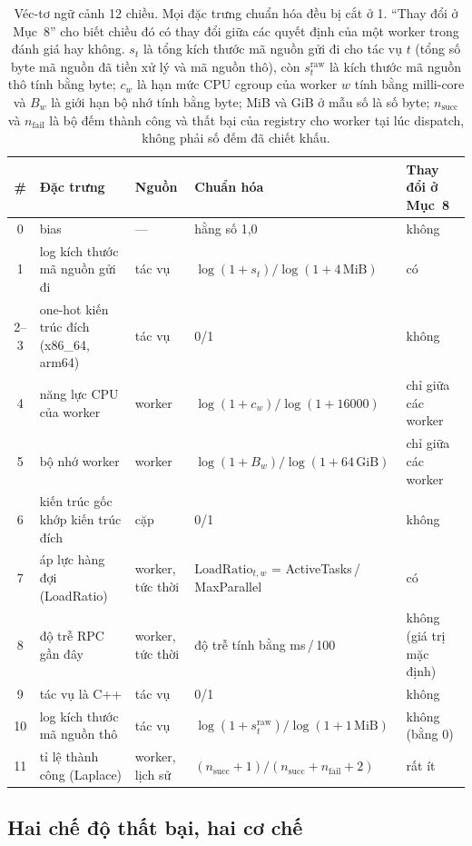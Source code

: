 \documentclass[final,5p,times,twocolumn]{elsarticle}
\begin{document}
\begin{table}[t]
\centering
\caption{Véc-tơ ngữ cảnh 12 chiều. Mọi đặc trưng chuẩn hóa đều bị cắt ở 1. ``Thay đổi ở Mục~8'' cho biết chiều đó có thay đổi giữa các quyết định của một worker trong đánh giá hay không. $s_t$ là tổng kích thước mã nguồn gửi đi cho tác vụ $t$ (tổng số byte mã nguồn đã tiền xử lý và mã nguồn thô), còn $s^{\text{raw}}_t$ là kích thước mã nguồn thô tính bằng byte; $c_w$ là hạn mức CPU cgroup của worker $w$ tính bằng milli-core và $B_w$ là giới hạn bộ nhớ tính bằng byte; MiB và GiB ở mẫu số là số byte; $n_{\text{succ}}$ và $n_{\text{fail}}$ là bộ đếm thành công và thất bại của registry cho worker tại lúc dispatch, không phải số đếm đã chiết khấu.}
\label{tab:features}
\footnotesize
\begin{tabular}{cllll}
\toprule
\# & Đặc trưng & Nguồn & Chuẩn hóa & Thay đổi ở Mục~8 \\
\midrule
0 & bias & --- & hằng số 1,0 & không \\
1 & log kích thước mã nguồn gửi đi & tác vụ & $\log(1+s_t)/\log(1+4\,\text{MiB})$ & có \\
2--3 & one-hot kiến trúc đích (x86\_64, arm64) & tác vụ & 0/1 & không \\
4 & năng lực CPU của worker & worker & $\log(1+c_w)/\log(1+16000)$ & chỉ giữa các worker \\
5 & bộ nhớ worker & worker & $\log(1+B_w)/\log(1+64\,\text{GiB})$ & chỉ giữa các worker \\
6 & kiến trúc gốc khớp kiến trúc đích & cặp & 0/1 & không \\
7 & áp lực hàng đợi (LoadRatio) & worker, tức thời & $\text{LoadRatio}_{t,w}$ = ActiveTasks\,/\,MaxParallel & có \\
8 & độ trễ RPC gần đây & worker, tức thời & độ trễ tính bằng ms\,/\,100 & không (giá trị mặc định) \\
9 & tác vụ là C++ & tác vụ & 0/1 & không \\
10 & log kích thước mã nguồn thô & tác vụ & $\log(1+s^{\text{raw}}_t)/\log(1+1\,\text{MiB})$ & không (bằng 0) \\
11 & tỉ lệ thành công (Laplace) & worker, lịch sử & $(n_{\text{succ}}+1)/(n_{\text{succ}}+n_{\text{fail}}+2)$ & rất ít \\
\bottomrule
\end{tabular}
\end{table}

\subsection{Hai chế độ thất bại, hai cơ chế}
\label{sec:mechanisms}
\end{document}
